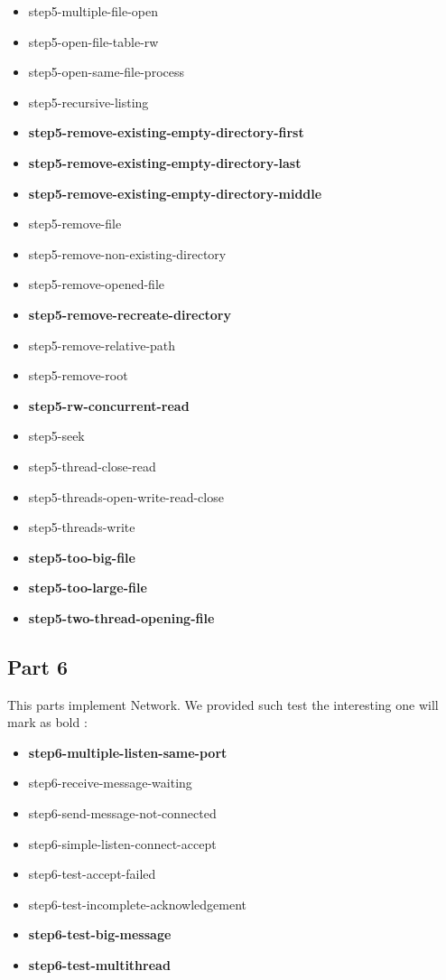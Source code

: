 \documentclass[a4paper,10pt]{article}
\begin{document}
\begin{itemize}
\item step5-multiple-file-open
\item {step5-open-file-table-rw}
\item step5-open-same-file-process
\item step5-recursive-listing
\item {\bf step5-remove-existing-empty-directory-first}
\item {\bf step5-remove-existing-empty-directory-last}
\item {\bf step5-remove-existing-empty-directory-middle}
\item step5-remove-file
\item step5-remove-non-existing-directory
\item step5-remove-opened-file
\item {\bf step5-remove-recreate-directory}
\item step5-remove-relative-path
\item step5-remove-root
\item {\bf step5-rw-concurrent-read}
\item step5-seek
\item step5-thread-close-read
\item step5-threads-open-write-read-close
\item step5-threads-write
\item {\bf step5-too-big-file}
\item {\bf step5-too-large-file}
\item {\bf step5-two-thread-opening-file}
\end{itemize} 

\subsection{Part 6}

This parts implement Network. We provided such test the interesting one will mark as bold :
\begin{itemize}
\item {\bf step6-multiple-listen-same-port}
\item step6-receive-message-waiting
\item step6-send-message-not-connected
\item step6-simple-listen-connect-accept
\item step6-test-accept-failed
\item step6-test-incomplete-acknowledgement
\item {\bf step6-test-big-message}
\item {\bf step6-test-multithread}
\end{itemize} 
\end{document}
